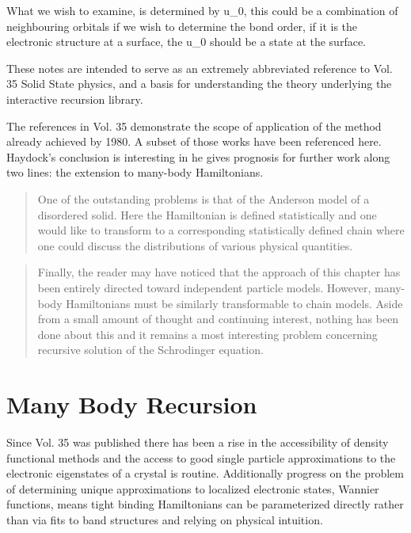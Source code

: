 What we wish to examine, is determined by u_{0}, this could be a combination
of neighbouring orbitals if we wish to determine the bond order, if it is the electronic
structure at a surface, the u_{0} should be a state at the surface.

These notes are intended to serve as an extremely abbreviated reference 
to Vol. 35 Solid State physics, and a basis for understanding the theory 
underlying the interactive recursion library.

The references in Vol. 35 demonstrate the scope of application of the method 
already achieved by 1980. A subset of those works have been referenced here. 
Haydock's conclusion is interesting in he gives prognosis for further work
along two lines: the extension to many-body Hamiltonians.

\begin{quote}
One of the outstanding problems is that of the Anderson model
of a disordered solid. Here the Hamiltonian is defined statistically and
one would like to transform to a corresponding statistically defined chain where
one could discuss the distributions of various physical quantities.
\end{quote}

\begin{quote}
Finally, the reader may have noticed that the approach of this chapter has been entirely directed
toward independent particle models. However, many-body Hamiltonians must be similarly 
transformable to chain models. Aside from a small amount of thought and continuing interest, 
nothing has been done about this and it remains a most interesting problem concerning recursive 
solution of the Schrodinger equation.
\end{quote}

\section{Many Body Recursion}
\label{sec:manybodyrecursion}
	Since Vol. 35 was published there has been a rise in the accessibility of density functional methods 
and the access to good single particle approximations to the electronic eigenstates of a crystal
is routine. Additionally progress on the problem of determining unique approximations to localized
electronic states, Wannier functions, means tight binding Hamiltonians can be parameterized directly
rather than via fits to band structures and relying on physical intuition.

